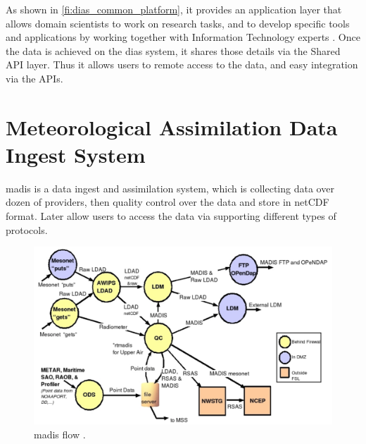 As shown in \cref{fi:dias_common_platform}, it provides an application layer that allows domain scientists to work on research tasks, and to develop specific tools and applications by working together with Information Technology experts \cite{Kawasaki2018DataReduction}. Once the data is achieved on the \acrshort{dias} system, it shares those details via the Shared API layer. Thus it allows users to remote access to the data, and easy integration via the APIs.



\section{Meteorological Assimilation Data Ingest System}
\label{se:madis}
\acrfull{madis} is a data ingest and assimilation system, which is collecting data over dozen of providers, then quality control over the data and store in \acrshort{netCDF} format. Later allow users to access the data via supporting different types of protocols.

\begin{figure}[htp]
    \centering
    \includegraphics[width=1\textwidth]{lit/other/madis_flow.png}
    \caption[\acrshort{madis} flow]{\acrshort{madis} flow \cite{Macdermaid2005ARCHITECTUREP2.39}.}
    \label{fi:madis_flow}
\end{figure}


